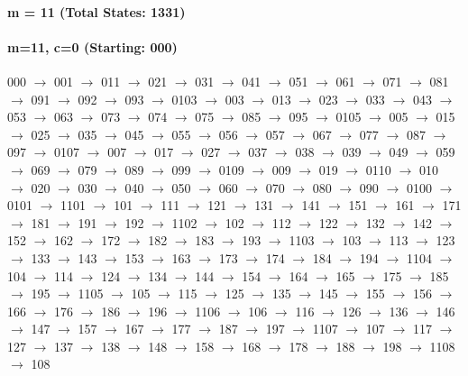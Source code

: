 \paragraph{m = 11 (Total States: 1331)}



\paragraph{ m=11, c=0 (Starting: 000)}



000 $\rightarrow$ 001 $\rightarrow$ 011 $\rightarrow$ 021 $\rightarrow$ 031 $\rightarrow$ 041 $\rightarrow$ 051 $\rightarrow$ 061 $\rightarrow$ 071 $\rightarrow$ 081 $\rightarrow$ 091 $\rightarrow$ 092 $\rightarrow$ 093 $\rightarrow$ 0103 $\rightarrow$ 003 $\rightarrow$ 013 $\rightarrow$ 023 $\rightarrow$ 033 $\rightarrow$ 043 $\rightarrow$ 053 $\rightarrow$ 063 $\rightarrow$ 073 $\rightarrow$ 074 $\rightarrow$ 075 $\rightarrow$ 085 $\rightarrow$ 095 $\rightarrow$ 0105 $\rightarrow$ 005 $\rightarrow$ 015 $\rightarrow$ 025 $\rightarrow$ 035 $\rightarrow$ 045 $\rightarrow$ 055 $\rightarrow$ 056 $\rightarrow$ 057 $\rightarrow$ 067 $\rightarrow$ 077 $\rightarrow$ 087 $\rightarrow$ 097 $\rightarrow$ 0107 $\rightarrow$ 007 $\rightarrow$ 017 $\rightarrow$ 027 $\rightarrow$ 037 $\rightarrow$ 038 $\rightarrow$ 039 $\rightarrow$ 049 $\rightarrow$ 059 $\rightarrow$ 069 $\rightarrow$ 079 $\rightarrow$ 089 $\rightarrow$ 099 $\rightarrow$ 0109 $\rightarrow$ 009 $\rightarrow$ 019 $\rightarrow$ 0110 $\rightarrow$ 010 $\rightarrow$ 020 $\rightarrow$ 030 $\rightarrow$ 040 $\rightarrow$ 050 $\rightarrow$ 060 $\rightarrow$ 070 $\rightarrow$ 080 $\rightarrow$ 090 $\rightarrow$ 0100 $\rightarrow$ 0101 $\rightarrow$ 1101 $\rightarrow$ 101 $\rightarrow$ 111 $\rightarrow$ 121 $\rightarrow$ 131 $\rightarrow$ 141 $\rightarrow$ 151 $\rightarrow$ 161 $\rightarrow$ 171 $\rightarrow$ 181 $\rightarrow$ 191 $\rightarrow$ 192 $\rightarrow$ 1102 $\rightarrow$ 102 $\rightarrow$ 112 $\rightarrow$ 122 $\rightarrow$ 132 $\rightarrow$ 142 $\rightarrow$ 152 $\rightarrow$ 162 $\rightarrow$ 172 $\rightarrow$ 182 $\rightarrow$ 183 $\rightarrow$ 193 $\rightarrow$ 1103 $\rightarrow$ 103 $\rightarrow$ 113 $\rightarrow$ 123 $\rightarrow$ 133 $\rightarrow$ 143 $\rightarrow$ 153 $\rightarrow$ 163 $\rightarrow$ 173 $\rightarrow$ 174 $\rightarrow$ 184 $\rightarrow$ 194 $\rightarrow$ 1104 $\rightarrow$ 104 $\rightarrow$ 114 $\rightarrow$ 124 $\rightarrow$ 134 $\rightarrow$ 144 $\rightarrow$ 154 $\rightarrow$ 164 $\rightarrow$ 165 $\rightarrow$ 175 $\rightarrow$ 185 $\rightarrow$ 195 $\rightarrow$ 1105 $\rightarrow$ 105 $\rightarrow$ 115 $\rightarrow$ 125 $\rightarrow$ 135 $\rightarrow$ 145 $\rightarrow$ 155 $\rightarrow$ 156 $\rightarrow$ 166 $\rightarrow$ 176 $\rightarrow$ 186 $\rightarrow$ 196 $\rightarrow$ 1106 $\rightarrow$ 106 $\rightarrow$ 116 $\rightarrow$ 126 $\rightarrow$ 136 $\rightarrow$ 146 $\rightarrow$ 147 $\rightarrow$ 157 $\rightarrow$ 167 $\rightarrow$ 177 $\rightarrow$ 187 $\rightarrow$ 197 $\rightarrow$ 1107 $\rightarrow$ 107 $\rightarrow$ 117 $\rightarrow$ 127 $\rightarrow$ 137 $\rightarrow$ 138 $\rightarrow$ 148 $\rightarrow$ 158 $\rightarrow$ 168 $\rightarrow$ 178 $\rightarrow$ 188 $\rightarrow$ 198 $\rightarrow$ 1108 $\rightarrow$ 108 